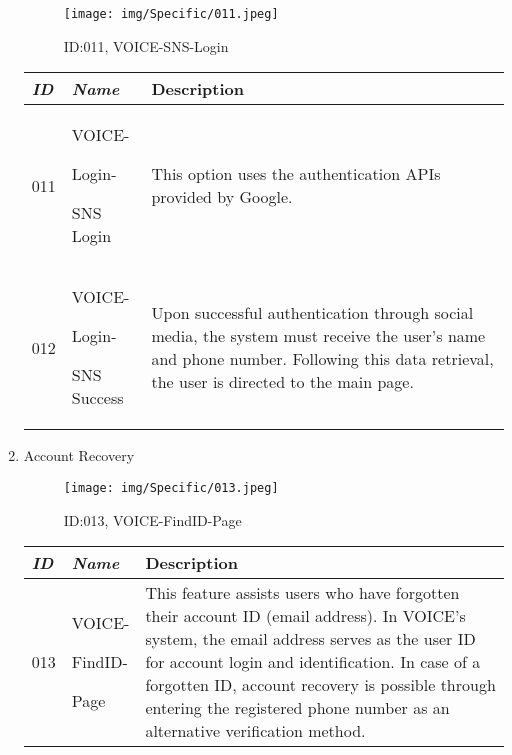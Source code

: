 \documentclass[conference]{IEEEtran}
\begin{document}
\begin{enumerate}[label=\arabic*]
    \vspace{2em}

    \begin{figure}[h]
        \centering
        \texttt{[image: img/Specific/011.jpeg]}
        \caption{ID:011, VOICE-SNS-Login}
    \end{figure}

    \begin{table}[h]
    \def\arraystretch{1.2} \small
        \begin{tabular}{|p{1cm}|p{1.8cm}|p{4.8cm}|}
        \hline
            \textit{\textbf{ID}} & \textit{\textbf{Name}} & {\textbf{Description}} \\
        \hline
            011 \par & VOICE-\par Login-\par SNS Login & This option uses the authentication APIs provided by Google. \\
        \hline
            012 \par & VOICE-\par Login-\par SNS Success & Upon successful authentication through social media, the system must receive the user's name and phone number. Following this data retrieval, the user is directed to the main page. \\
        \hline
        \end{tabular}
    \end{table}

    \newpage

    \item Account Recovery\par
    \vspace{0.3em}

    \begin{figure}[h]
        \centering
        \texttt{[image: img/Specific/013.jpeg]}
        \caption{ID:013, VOICE-FindID-Page}
    \end{figure}

    \begin{table}[h]
    \def\arraystretch{1.2} \small
        \begin{tabular}{|p{1cm}|p{1.8cm}|p{4.8cm}|}
        \hline
            \textit{\textbf{ID}} & \textit{\textbf{Name}} & {\textbf{Description}} \\
        \hline
            013 \par & VOICE-\par FindID-\par Page & This feature assists users who have forgotten their account ID (email address). In VOICE's system, the email address serves as the user ID for account login and identification. In case of a forgotten ID, account recovery is possible through entering the registered phone number as an alternative verification method. \\
        \hline
        \end{tabular}
    \end{table}


\end{enumerate}
\end{document}
